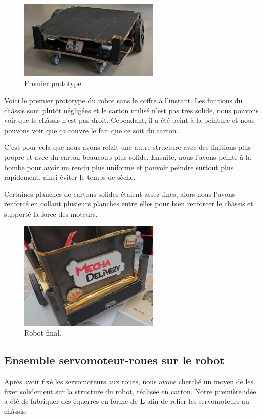 \documentclass[a4paper,12pt]{report}  %
\begin{document}
\begin{figure}[H]
	\centering
	\includegraphics[width=0.6\textwidth]{./attachments/prototype_1.jpg}
	\caption{Premier prototype.}
\end{figure}


Voici le premier prototype du robot sans le coffre à l’instant. Les finitions du châssis sont plutôt négligées et le carton utilisé n’est pas très solide, nous pouvons voir que le châssis n’est pas droit. Cependant, il a été peint à la peinture et nous pouvons voir que ça couvre le fait que ce soit du carton. 

C’est pour cela que nous avons refait une autre structure avec des finitions plus propre et avec du carton beaucoup plus solide. Ensuite, nous l’avons peinte à la bombe pour avoir un rendu plus uniforme et pouvoir peindre surtout plus rapidement, ainsi éviter le temps de sèche. 

Certaines planches de cartons solides étaient assez fines, alors nous l’avons renforcé en collant plusieurs planches entre elles pour bien renforcer le châssis et supporté la force des moteurs.

\begin{figure}[H]
	\centering
	\includegraphics[width=0.6\textwidth]{./attachments/robot_final_1.png}
	\caption{Robot final.}
\end{figure}


\subsection{Ensemble servomoteur-roues sur le robot}
Après avoir fixé les servomoteurs aux roues, nous avons cherché un moyen de les fixer solidement sur la structure du robot, réalisée en carton. Notre première idée a été de fabriquer des équerres en forme de \textbf{L} afin de relier les servomoteurs au châssis.
\end{document}
